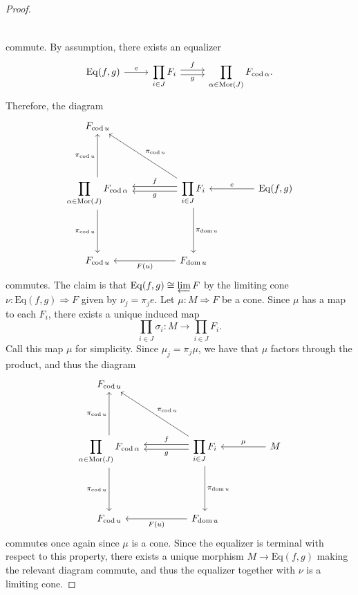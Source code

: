 \begin{proof}
\[\begin{tikzcd}[row sep = 3.5em, column sep = 3.5em]
	\end{tikzcd}\]
	commute. By assumption, there exists an equalizer
	\[\begin{tikzcd}[row sep = 2.5em, column sep = 2.5em]
		\operatorname{Eq} (f,g)\ar[" e ", r]  & \displaystyle{\prod_{i\in J} F_i}\ar[" f ", shift left, r] \ar[" g "', shift right, r]  & \displaystyle{\prod_{\alpha \in \operatorname{Mor} (J)} F_{\operatorname{cod} \alpha } }.
	\end{tikzcd}\]
	Therefore, the diagram
	\[\begin{tikzcd}[row sep = 4.5em, column sep = 4.5em]
	F_{\operatorname{cod} u}  & &  \\
	\displaystyle{\prod_{\alpha \in \operatorname{Mor} (J)} F_{\operatorname{cod} \alpha } }\ar[" \pi_{\operatorname{cod} u}  ", u] \ar[" \pi_{\operatorname{cod} u}  "', d]  & \displaystyle{\prod_{i\in J} F_i}\ar[" \pi_{\operatorname{cod} u}  "', ul] \ar[" \pi _{\operatorname{dom} u}  ", d] \ar[" f "', shift right, l] \ar[" g ", shift left, l] & \operatorname{Eq} (f,g)\ar[" e "', l]  \\
	F_{\operatorname{cod} u}  & F_{\operatorname{dom} u} \ar[" F(u) ", l]  & 
	\end{tikzcd}\]
	commutes. The claim is that $\operatorname{Eq} (f,g)\cong \varprojlim F$ by the limiting cone $\nu : \mathrm{Eq} (f,g) \Rightarrow F$ given by $\nu_j=\pi_j e$. Let $\mu : M \Rightarrow F$ be a cone. Since $\mu $ has a map to each $F_i$, there exists a unique induced map
	\[
		\prod_{i\in J} \sigma_i : M \to \prod_{i\in J} F_i
	.\]
	Call this map $\mu $ for simplicity. Since $\mu_j = \pi _j \mu $, we have that $\mu $ factors through the product, and thus the diagram
	\[\begin{tikzcd}[row sep = 4.5em, column sep = 4.5em]
	F_{\operatorname{cod} u}  & &  \\
	\displaystyle{\prod_{\alpha \in \operatorname{Mor} (J)} F_{\operatorname{cod} \alpha } }\ar[" \pi_{\operatorname{cod} u}  ", u] \ar[" \pi_{\operatorname{cod} u}  "', d]  & \displaystyle{\prod_{i\in J} F_i}\ar[" \pi_{\operatorname{cod} u}  "', ul] \ar[" \pi _{\operatorname{dom} u}  ", d] \ar[" f "', shift right, l] \ar[" g ", shift left, l] & M\ar[" \mu "', l]  \\
	F_{\operatorname{cod} u}  & F_{\operatorname{dom} u} \ar[" F(u) ", l]  & 
	\end{tikzcd}\]
	commutes once again since $\mu $ is a cone. Since the equalizer is terminal with respect to this property, there exists a unique morphism $M\to \mathrm{Eq} (f,g)$ making the relevant diagram commute, and thus the equalizer together with $\nu $ is a limiting cone.
\end{proof}

